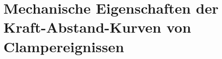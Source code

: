 	\chapter{Mechanische Eigenschaften der Kraft-Abstand-Kurven von Clampereignissen}
	\label{appendix:B}